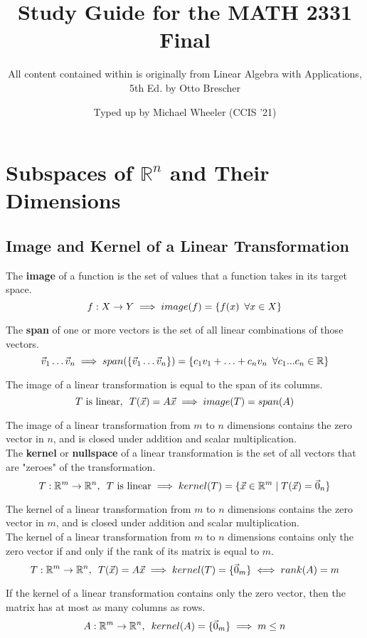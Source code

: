 \documentclass[]{scrartcl}
\title{Study Guide for the MATH 2331 Final}
\subtitle{All content contained within is originally from Linear Algebra with Applications, 5th Ed. by Otto Brescher}
\author{Typed up by Michael Wheeler (CCIS '21)}
\begin{document}
	\maketitle
	
	\setcounter{section}{2}
	\section{Subspaces of $\mathbb{R}^n$ and Their Dimensions}
	\subsection{Image and Kernel of a Linear Transformation}
	The \textbf{image} of a function is the set of values that a function takes in its target space.
	$$
	f: X \rightarrow Y \implies image(f) = \{ f(x) \enskip \forall x \in X \}
	$$
	
	The \textbf{span} of one or more vectors is the set of all linear combinations of those vectors.
	$$
	\vec{v}_{1} \ldots \vec{v}_{n} \implies span(\{\vec{v}_{1} \ldots \vec{v}_{n}\}) = \{
	c_{1}v_{1} + \ldots + c_{n}v_{n} \enskip \forall  c_{1}...c_{n} \in \mathbb{R}
	\}
	$$
	
	 The image of a linear transformation is equal to the span of its columns.
	$$
	T \text{ is linear}, \enskip T(\vec{x}) = A\vec{x} \implies image(T) = span(A)
	$$
	
	The image of a linear transformation from $m$ to $n$ dimensions contains the zero vector in $n$, and is closed under addition and scalar multiplication.\\
	
	The \textbf{kernel} or \textbf{nullspace} of a linear transformation is the set of all vectors that are "zeroes" of the transformation.
	$$
	T: \mathbb{R}^m \rightarrow \mathbb{R}^n, \enskip T \text{ is linear} \implies kernel(T) = \{ \vec{x} \in \mathbb{R}^m \mid T(\vec{x}) = \vec{0}_n \}
	$$
	
	The kernel of a linear transformation from $m$ to $n$ dimensions contains the zero vector in $m$, and is closed under addition and scalar multiplication.\\
	
	The kernel of a linear transformation from $m$ to $n$ dimensions contains only the zero vector if and only if the rank of its matrix is equal to $m$.
	$$
	T: \mathbb{R}^m \rightarrow \mathbb{R}^n,  \enskip T(\vec{x}) = A\vec{x} \implies kernel(T) = \{\vec{0}_m\} \iff rank(A) = m
	$$
	
	If the kernel of a linear transformation contains only the zero vector, then the matrix has at most as many columns as rows.
	$$
	A: \mathbb{R}^m \rightarrow \mathbb{R}^n, \enskip kernel(A) = \{\vec{0}_m\} \implies m \leq n
	$$
	
\end{document}
